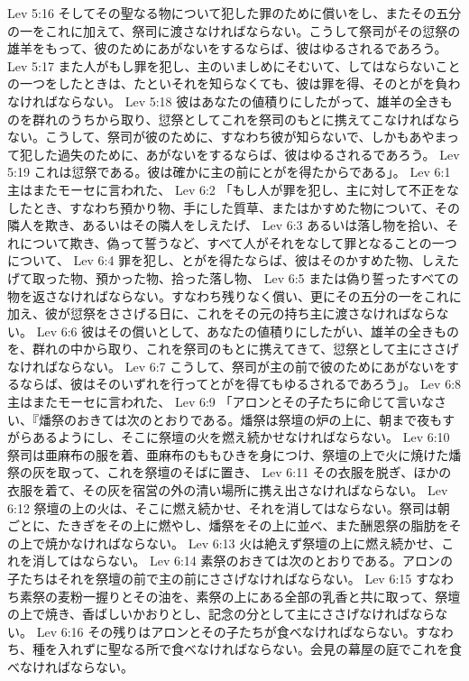 Lev 5:16  そしてその聖なる物について犯した罪のために償いをし、またその五分の一をこれに加えて、祭司に渡さなければならない。こうして祭司がその愆祭の雄羊をもって、彼のためにあがないをするならば、彼はゆるされるであろう。
Lev 5:17  また人がもし罪を犯し、主のいましめにそむいて、してはならないことの一つをしたときは、たといそれを知らなくても、彼は罪を得、そのとがを負わなければならない。
Lev 5:18  彼はあなたの値積りにしたがって、雄羊の全きものを群れのうちから取り、愆祭としてこれを祭司のもとに携えてこなければならない。こうして、祭司が彼のために、すなわち彼が知らないで、しかもあやまって犯した過失のために、あがないをするならば、彼はゆるされるであろう。
Lev 5:19  これは愆祭である。彼は確かに主の前にとがを得たからである」。
Lev 6:1  主はまたモーセに言われた、
Lev 6:2  「もし人が罪を犯し、主に対して不正をなしたとき、すなわち預かり物、手にした質草、またはかすめた物について、その隣人を欺き、あるいはその隣人をしえたげ、
Lev 6:3  あるいは落し物を拾い、それについて欺き、偽って誓うなど、すべて人がそれをなして罪となることの一つについて、
Lev 6:4  罪を犯し、とがを得たならば、彼はそのかすめた物、しえたげて取った物、預かった物、拾った落し物、
Lev 6:5  または偽り誓ったすべての物を返さなければならない。すなわち残りなく償い、更にその五分の一をこれに加え、彼が愆祭をささげる日に、これをその元の持ち主に渡さなければならない。
Lev 6:6  彼はその償いとして、あなたの値積りにしたがい、雄羊の全きものを、群れの中から取り、これを祭司のもとに携えてきて、愆祭として主にささげなければならない。
Lev 6:7  こうして、祭司が主の前で彼のためにあがないをするならば、彼はそのいずれを行ってとがを得てもゆるされるであろう」。
Lev 6:8  主はまたモーセに言われた、
Lev 6:9  「アロンとその子たちに命じて言いなさい、『燔祭のおきては次のとおりである。燔祭は祭壇の炉の上に、朝まで夜もすがらあるようにし、そこに祭壇の火を燃え続かせなければならない。
Lev 6:10  祭司は亜麻布の服を着、亜麻布のももひきを身につけ、祭壇の上で火に焼けた燔祭の灰を取って、これを祭壇のそばに置き、
Lev 6:11  その衣服を脱ぎ、ほかの衣服を着て、その灰を宿営の外の清い場所に携え出さなければならない。
Lev 6:12  祭壇の上の火は、そこに燃え続かせ、それを消してはならない。祭司は朝ごとに、たきぎをその上に燃やし、燔祭をその上に並べ、また酬恩祭の脂肪をその上で焼かなければならない。
Lev 6:13  火は絶えず祭壇の上に燃え続かせ、これを消してはならない。
Lev 6:14  素祭のおきては次のとおりである。アロンの子たちはそれを祭壇の前で主の前にささげなければならない。
Lev 6:15  すなわち素祭の麦粉一握りとその油を、素祭の上にある全部の乳香と共に取って、祭壇の上で焼き、香ばしいかおりとし、記念の分として主にささげなければならない。
Lev 6:16  その残りはアロンとその子たちが食べなければならない。すなわち、種を入れずに聖なる所で食べなければならない。会見の幕屋の庭でこれを食べなければならない。
